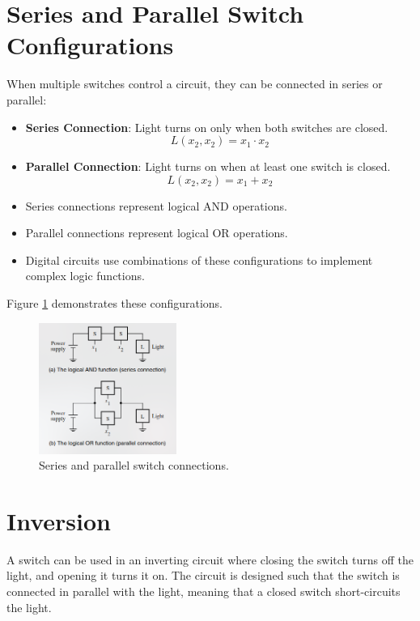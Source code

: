 \documentclass[twocolumn]{article}
\begin{document}
\section{Series and Parallel Switch Configurations}
When multiple switches control a circuit, they can be connected in series or parallel:
\begin{itemize}
\item \textbf{Series Connection}: Light turns on only when both switches are closed.
\begin{equation}
L(x_2, x_2) = x_1 \cdot x_2
\end{equation}
\item \textbf{Parallel Connection}: Light turns on when at least one switch is closed.
\begin{equation}
L(x_2, x_2) = x_1 + x_2
\end{equation}
\item Series connections represent logical AND operations.
\item Parallel connections represent logical OR operations.
\item Digital circuits use combinations of these configurations to implement complex logic functions.
\end{itemize}
Figure \ref{fig:series_parallel} demonstrates these configurations.

\begin{figure}[h]
\centering
\includegraphics[width=0.4\textwidth]{series_parallel.png} %
\caption{Series and parallel switch connections.}
\label{fig:series_parallel}
\end{figure}

\section{Inversion}
A switch can be used in an inverting circuit where closing the switch turns off the light, and opening it turns it on. The circuit is designed such that the switch is connected in parallel with the light, meaning that a closed switch short-circuits the light.
\end{document}
